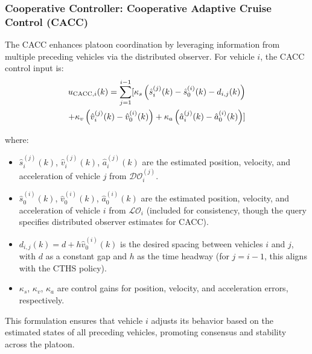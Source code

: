 \documentclass[letterpaper, 10pt, conference]{ieeeconf}  %
\def\LO{\mathcal{LO}} %
\def\DO{\mathcal{DO}} %
\begin{document}
\subsubsection{Cooperative Controller: Cooperative Adaptive Cruise Control (CACC)}
The CACC enhances platoon coordination by leveraging information from multiple preceding vehicles via the distributed observer. For vehicle $i$, the CACC control input is:
\begin{align}
    u_{\text{CACC},i}(k) = \sum_{j=1}^{i-1} [ \kappa_s \left( \hat{s}_i^{(j)}(k) - \hat{s}_0^{(i)}(k) - d_{i,j}(k) \right) \\ \notag +  \kappa_v \left( \hat{v}_i^{(j)}(k) -  \hat{v}_0^{(i)}(k) \right) + \kappa_a \left( \hat{a}_i^{(j)}(k) - \hat{a}_0^{(i)}(k) \right)]
\end{align}

where:
\begin{itemize}
    \item $\hat{s}_i^{(j)}(k)$, $\hat{v}_i^{(j)}(k)$, $\hat{a}_i^{(j)}(k)$ are the estimated position, velocity, and acceleration of vehicle $j$ from $\DO_i^{(j)}$.
    \item $\hat{s}_0^{(i)}(k)$, $\hat{v}_0^{(i)}(k)$, $\hat{a}_0^{(i)}(k)$ are the estimated position, velocity, and acceleration of vehicle $i$ from $\LO_i$ (included for consistency, though the query specifies distributed observer estimates for CACC).
    \item $d_{i,j}(k) = d + h \hat{v}_0^{(i)}(k)$ is the desired spacing between vehicles $i$ and $j$, with $d$ as a constant gap and $h$ as the time headway (for $j = i-1$, this aligns with the CTHS policy).
    \item $\kappa_s$, $\kappa_v$, $\kappa_a$ are control gains for position, velocity, and acceleration errors, respectively.
\end{itemize}
This formulation ensures that vehicle $i$ adjusts its behavior based on the estimated states of all preceding vehicles, promoting consensus and stability across the platoon.

\end{document}
